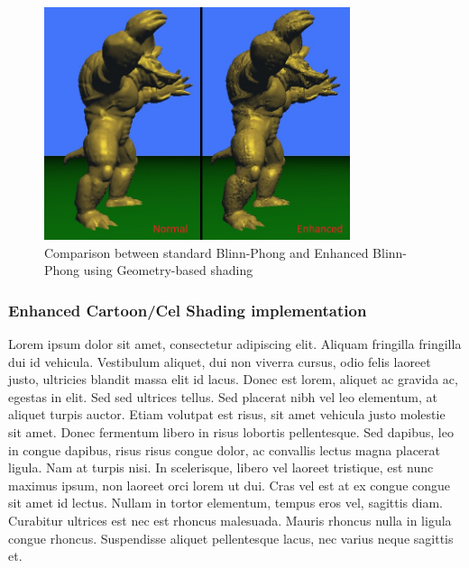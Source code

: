\pagebreak
\begin{figure}[h]
	\centering
	\includegraphics[width=0.8\textwidth]{Images/blinn_comparison.png}
	\caption{Comparison between standard Blinn-Phong and Enhanced Blinn-Phong using Geometry-based shading}
	\label{fig:blinn_comparison}
\end{figure}

\subsubsection{Enhanced Cartoon/Cel Shading implementation}
Lorem ipsum dolor sit amet, consectetur adipiscing elit. Aliquam fringilla fringilla dui id vehicula. Vestibulum aliquet, dui non viverra cursus, odio felis laoreet justo, ultricies blandit massa elit id lacus. Donec est lorem, aliquet ac gravida ac, egestas in elit. Sed sed ultrices tellus. Sed placerat nibh vel leo elementum, at aliquet turpis auctor. Etiam volutpat est risus, sit amet vehicula justo molestie sit amet. Donec fermentum libero in risus lobortis pellentesque. Sed dapibus, leo in congue dapibus, risus risus congue dolor, ac convallis lectus magna placerat ligula. Nam at turpis nisi. In scelerisque, libero vel laoreet tristique, est nunc maximus ipsum, non laoreet orci lorem ut dui. Cras vel est at ex congue congue sit amet id lectus. Nullam in tortor elementum, tempus eros vel, sagittis diam. Curabitur ultrices est nec est rhoncus malesuada. Mauris rhoncus nulla in ligula congue rhoncus. Suspendisse aliquet pellentesque lacus, nec varius neque sagittis et.

